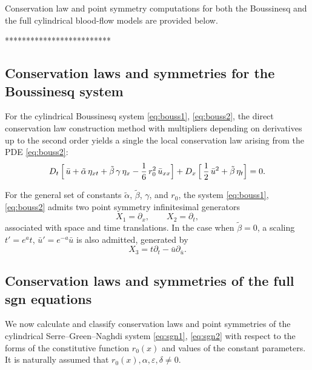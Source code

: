 \documentclass[alpha-refs, 12pt]{wiley-article}
\newcommand{\eps}{\varepsilon}
\begin{document}
Conservation law and point symmetry computations for both the Boussinesq and the full cylindrical blood-flow models are provided below.

*************************


\subsection{Conservation laws and symmetries for the Boussinesq system}\label{ssec:symm:Bouss}

For the cylindrical Boussinesq system \eqref{eq:bouss1}, \eqref{eq:bouss2}, the direct conservation law construction method with multipliers depending on derivatives up to the second order yields a single the local conservation law arising from the PDE \eqref{eq:bouss2}:
\begin{equation}\label{eq:Bsq:CL}
  D_{t}\,\Bigl[\,\bar{u}  + \tilde{\alpha}\,\eta_{xt} + \tilde{\beta}\,\gamma\,\eta_{x}
         -\frac{1}{6}\,r_{0}^{2}\,\bar{u}_{xx}\Bigr]
  + D_{x}\,\Bigl[\,\frac{1}{2}\,\bar{u}^{2} + \tilde{\beta}\,\eta_{t}\Bigr]=0 .
\end{equation}

For the general set of constants $\tilde{\alpha}$, $\tilde{\beta}$, $\gamma$, and $r_{0}$, the system \eqref{eq:bouss1}, \eqref{eq:bouss2} admits two point symmetry infinitesimal generators
\[
  X_{1}=\partial_{x},  \qquad   X_{2}=\partial_{t},
\]
associated with space and time translations. In the case when $\tilde{\beta}=0$, a scaling $t'=e^{a}t$, $\bar{u}'=e^{-a} \bar{u}$ is also admitted, generated by
\[
  X_{3}=t \partial_{t} - \bar{u} \partial_{\bar{u}}.
\]


\subsection{Conservation laws and symmetries of the full \acrfull{sgn} equations}\label{ssec:symm:Full}


We now calculate and classify conservation laws and point symmetries of the cylindrical Serre–Green–Naghdi system \eqref{eq:sgn1}, \eqref{eq:sgn2} with respect to the forms of the constitutive function $r_0(x)$ and values of the constant parameters. It is naturally assumed that $r_0(x),\alpha, \eps, \delta \ne 0$.
\end{document}
